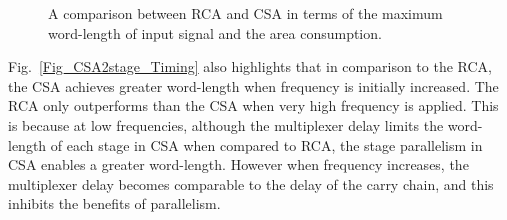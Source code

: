 \documentclass[prodmode,acmtrets]{acmsmall} %
\begin{document}
\begin{figure}[htbp]
        \centering
    \caption{A comparison between RCA and CSA in terms of the maximum word-length of input signal and the area consumption.}
\end{figure}

Fig.~\ref{Fig_CSA2stage_Timing} also highlights that in comparison to the RCA, the CSA achieves greater word-length when frequency is initially increased. The RCA only outperforms than the CSA when very high frequency is applied. This is because at low frequencies, although the multiplexer delay limits the word-length of each stage in CSA when compared to RCA, the stage parallelism in CSA enables a greater word-length. However when frequency increases, the multiplexer delay becomes comparable to the delay of the carry chain, and this inhibits the benefits of parallelism.
\end{document}
